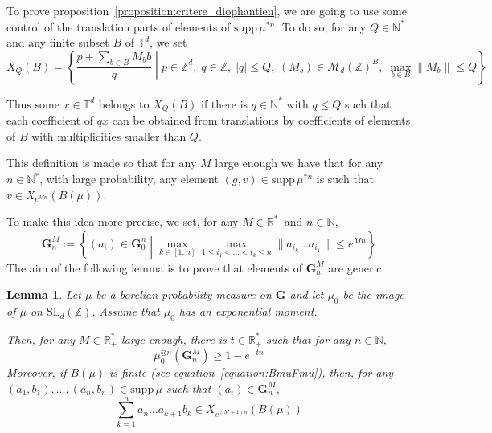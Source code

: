 \documentclass[11pt]{amsart}
\newtheorem{lemma}[theorem]{Lemma}
\theoremstyle{definition}
\theoremstyle{remark}
\numberwithin{equation}{section}
\begin{document}
To prove proposition~\ref{proposition:critere_diophantien}, we are going to use some control of the translation parts of elements of ${\mathrm{supp}\,}\mu^{\ast n}$. To do so, for any $Q\in {\mathbb N}^\ast$ and any finite subset $B$ of $  {\mathbb T}^d$, we set
\[
X_Q(B) = \left\{ \frac {p + \sum_{b\in B} M_bb}q\middle| p\in{\mathbb Z}^d,\;q\in {\mathbb Z},\;|q|\leqslant Q,\;(M_b)\in \mathcal{M}_d({\mathbb Z})^B,\;\max_{b\in B}\|M_b\|\leqslant Q\right\}
\]

Thus some $x\in {\mathbb T}^d$ belongs to $X_Q(B) $ if there is $q\in {\mathbb N}^\ast$ with $q\leqslant Q$ such that each coefficient of $qx$ can be obtained from translations by coefficients of elements of $B$ with multiplicities smaller than $Q$.

This definition is made so that for any $M$ large enough we have that for any $n\in {\mathbb N}^\ast$, with large probability, any element $(g,v)\in {\mathrm{supp}\,}\mu^{\ast n}$ is such that $v\in X_{e^{Mn}}(B(\mu))$.

To make this idea more precise, we set, for any $M\in {\mathbb R}_+^\ast$ and $n\in {\mathbb N}$,
\[
{\mathbf G}_n^M := \left\{( a_i) \in {\mathbf G}_0^n \middle|\max_{k\in [1,n]} \max_{1\leqslant i_1<\dots<i_k \leqslant n} \|a_{i_k}\dots a_ {i_1}\| \leqslant e^{Mn}\right\}
\]
The aim of the following lemma is to prove that elements of ${\mathbf G}_n^M$ are generic.
\begin{lemma} \label{lemma:controle_translations}
Let $\mu$ be a borelian probability measure on ${\mathbf G}$ and let $\mu_0$ be the image of $\mu$ on $\mathrm{SL}_d({\mathbb Z})$. Assume that $\mu_0$ has an exponential moment.

Then, for any $M\in {\mathbb R}_+^\ast$ large enough, there is $ t\in {\mathbb R}_+^\ast$ such that for any $n\in {\mathbb N}$,
\[
\mu^{\otimes n}_0\left({\mathbf G}_n^M\right) \geqslant 1 - e^{-tn}
\]
Moreover, if $B(\mu)$ is finite (see equation~\eqref{equation:BmuFmu}), then, for any $(a_1,b_1), \dots ,(a_n,b_n) \in {\mathrm{supp}\,}\mu$ such that $(a_i) \in {\mathbf G}_n^M$,
\[
\sum_{k=1}^n a_n \dots a_{k+1} b_k \in X_{e^{(M+1)n}}(B(\mu))
\]
\end{lemma}
\end{document}
